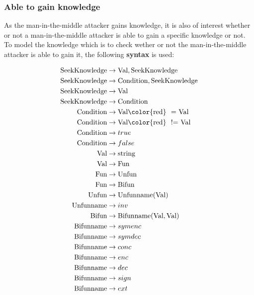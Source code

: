 \documentclass[12pt,journal,compsoc]{IEEEtran}
\newcommand{\MITMA}[0]{man-in-the-middle attacker }
\begin{document}
\subsubsection{Able to gain knowledge} \label{subsubsec:seeksyntax}

As the \MITMA gains knowledge, it is also of interest whether or not a \MITMA 
is able to gain a specific knowledge or not. To model the knowledge which is to check 
wether or not the \MITMA is able to gain it, the following \textbf{syntax} is used:

\begin{small}
\begin{align*}
	\text{SeekKnowledge}	&\rightarrow \text{Val}, \text{SeekKnowledge}					\\
	\text{SeekKnowledge}	&\rightarrow \text{Condition}, \text{SeekKnowledge}			\\
	\text{SeekKnowledge}	&\rightarrow \text{Val}									\\
	\text{SeekKnowledge}	&\rightarrow \text{Condition}								\\
	\text{Condition}		&\rightarrow \text{Val} \text{\color{red} \ = } \text{Val} 		\\
	\text{Condition}		&\rightarrow \text{Val} \text{\color{red} \ != } \text{Val}		\\
	\text{Condition}		&\rightarrow true 											\\
	\text{Condition}		&\rightarrow false											\\
	\text{Val}    		&\rightarrow \text{string}									\\
	\text{Val}    		&\rightarrow \text{Fun}									\\
	\text{Fun}  			&\rightarrow \text{Unfun}									\\
	\text{Fun}  			&\rightarrow \text{Bifun}									\\
	\text{Unfun}			&\rightarrow \text{Unfunname} ( \text{Val} )					\\
	\text{Unfunname}		&\rightarrow inv											\\
	\text{Bifun}			&\rightarrow \text{Bifunname} ( \text{Val} , \text{Val} )		\\
	\text{Bifunname}		&\rightarrow symenc 										\\
	\text{Bifunname}		&\rightarrow symdec 										\\
	\text{Bifunname}		&\rightarrow conc 											\\
	\text{Bifunname}		&\rightarrow enc											\\
	\text{Bifunname}		&\rightarrow dec 											\\
	\text{Bifunname}		&\rightarrow sign											\\
	\text{Bifunname}		&\rightarrow ext		
\end{align*}
\end{small}
\end{document}
